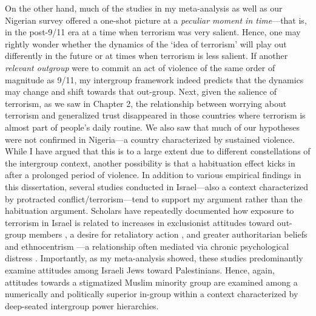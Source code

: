 On the other hand, much of the studies in my meta-analysis as well as our Nigerian survey offered a one-shot picture at a \textit{peculiar moment in time}---that is, in the post-9/11 era at a time when terrorism was very salient. Hence, one may rightly wonder whether the dynamics of the `idea of terrorism' will play out differently in the future or at times when terrorism is less salient. If another \textit{relevant outgroup} were to commit an act of violence of the same order of magnitude as 9/11, my intergroup framework indeed predicts that the dynamics may change and shift towards that out-group. Next, given the salience of terrorism, as we saw in Chapter 2, the relationship between worrying about terrorism and generalized trust disappeared in those countries where terrorism is almost part of people's daily routine. We also saw that much of our hypotheses were not confirmed in Nigeria---a country characterized by sustained violence. While I have argued that this is to a large extent due to different constellations of the intergroup context, another possibility is that a habituation effect kicks in after a prolonged period of violence. In addition to various empirical findings in this dissertation, several studies conducted in Israel---also a context characterized by protracted conflict/terrorism---tend to support my argument rather than the habituation argument. Scholars have repeatedly documented how exposure to terrorism in Israel is related to increases in exclusionist attitudes toward out-group members \citep{Canetti2009, Canetti-Nisim2009b, Hall2009}, a desire for retaliatory action \citep{Kalagy2017}, and greater authoritarian beliefs and ethnocentrism \citep{Hobfoll2006a}---a relationship often mediated via chronic psychological distress \citep{Canetti-Nisim2009b, Hobfoll2006a}. Importantly, as my meta-analysis showed, these studies predominantly examine attitudes among Israeli Jews toward Palestinians. Hence, again, attitudes towards a stigmatized Muslim minority group are examined among a numerically and politically superior in-group within a context characterized by deep-seated intergroup power hierarchies. 


